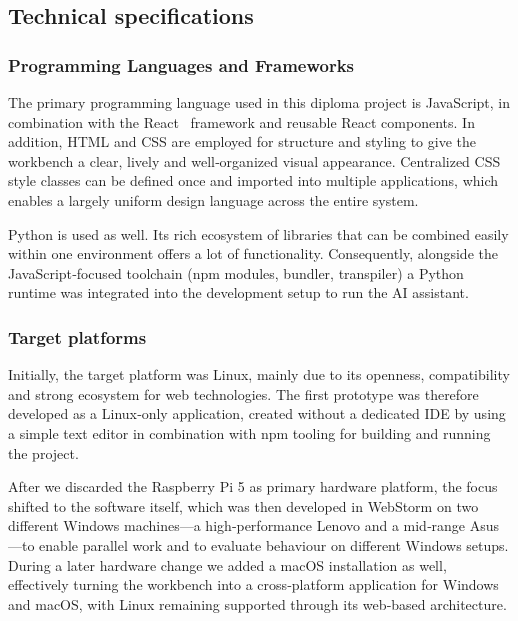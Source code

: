 \documentclass[a4paper,12pt]{article}
\begin{document}
\newpage
\subsection{Technical specifications}
\subsubsection{Programming Languages and Frameworks}
The primary programming language used in this diploma project is JavaScript, in combination with the React~\cite{react} framework and reusable React components. In addition, HTML and CSS are employed for structure and styling to give the workbench a clear, lively and well‑organized visual appearance. Centralized CSS style classes can be defined once and imported into multiple applications, which enables a largely uniform design language across the entire system.

Python is used as well. Its rich ecosystem of libraries that can be combined easily within one environment offers a lot of functionality. 
Consequently, alongside the JavaScript‑focused toolchain (npm modules, bundler, transpiler) a Python runtime was integrated into the development setup to run the AI assistant. 

\subsubsection{Target platforms}
Initially, the target platform was Linux, mainly due to its openness, compatibility and strong ecosystem for web technologies. The first prototype was therefore developed as a Linux‑only application, created without a dedicated IDE by using a simple text editor in combination with npm tooling for building and running the project.

After we discarded the Raspberry Pi 5 as primary hardware platform, the focus shifted to the software itself, which was then developed in WebStorm on two different Windows machines—a high‑performance Lenovo and a mid‑range Asus—to enable parallel work and to evaluate behaviour on different Windows setups. During a later hardware change we added a macOS installation as well, effectively turning the workbench into a cross‑platform application for Windows and macOS, with Linux remaining supported through its web‑based architecture.

\newpage
\end{document}
